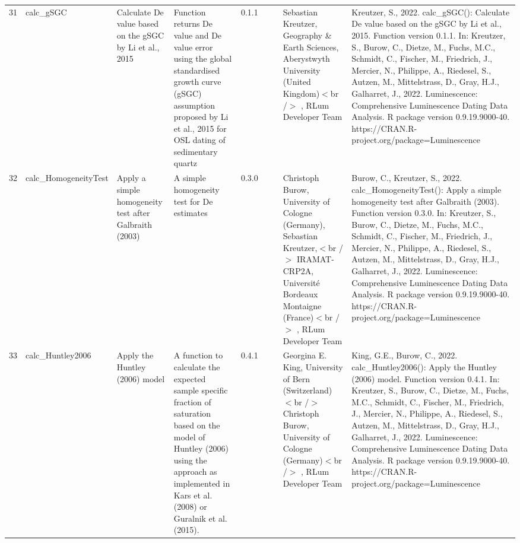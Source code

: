\begin{table}[ht]
\begin{tabular}{rllllllll}
 \\ 
  31 & calc\_gSGC & Calculate De value based on the gSGC by Li et al., 2015 & Function returns De value and De value error using the global standardised growth curve (gSGC) assumption proposed by Li et al., 2015 for OSL dating of sedimentary quartz & 0.1.1
 &  &  & Sebastian Kreutzer, Geography \& Earth Sciences, Aberystwyth University (United Kingdom)$<$br /$>$ , RLum Developer Team & Kreutzer, S., 2022. calc\_gSGC(): Calculate De value based on the gSGC by Li et al., 2015. Function version 0.1.1. In: Kreutzer, S., Burow, C., Dietze, M., Fuchs, M.C., Schmidt, C., Fischer, M., Friedrich, J., Mercier, N., Philippe, A., Riedesel, S., Autzen, M., Mittelstrass, D., Gray, H.J., Galharret, J., 2022. Luminescence: Comprehensive Luminescence Dating Data Analysis. R package version 0.9.19.9000-40. https://CRAN.R-project.org/package=Luminescence
 \\ 
  32 & calc\_HomogeneityTest & Apply a simple homogeneity test after Galbraith (2003) & A simple homogeneity test for De estimates & 0.3.0
 &  &  & Christoph Burow, University of Cologne (Germany), Sebastian Kreutzer,$<$br /$>$ IRAMAT-CRP2A, Université Bordeaux Montaigne (France)$<$br /$>$ , RLum Developer Team & Burow, C., Kreutzer, S., 2022. calc\_HomogeneityTest(): Apply a simple homogeneity test after Galbraith (2003). Function version 0.3.0. In: Kreutzer, S., Burow, C., Dietze, M., Fuchs, M.C., Schmidt, C., Fischer, M., Friedrich, J., Mercier, N., Philippe, A., Riedesel, S., Autzen, M., Mittelstrass, D., Gray, H.J., Galharret, J., 2022. Luminescence: Comprehensive Luminescence Dating Data Analysis. R package version 0.9.19.9000-40. https://CRAN.R-project.org/package=Luminescence
 \\ 
  33 & calc\_Huntley2006 & Apply the Huntley (2006) model & A function to calculate the expected sample specific fraction of saturation based on the model of Huntley (2006) using the approach as implemented in Kars et al. (2008) or Guralnik et al. (2015). & 0.4.1
 &  &  & Georgina E. King, University of Bern (Switzerland)  $<$br /$>$ Christoph Burow, University of Cologne (Germany)$<$br /$>$ , RLum Developer Team & King, G.E., Burow, C., 2022. calc\_Huntley2006(): Apply the Huntley (2006) model. Function version 0.4.1. In: Kreutzer, S., Burow, C., Dietze, M., Fuchs, M.C., Schmidt, C., Fischer, M., Friedrich, J., Mercier, N., Philippe, A., Riedesel, S., Autzen, M., Mittelstrass, D., Gray, H.J., Galharret, J., 2022. Luminescence: Comprehensive Luminescence Dating Data Analysis. R package version 0.9.19.9000-40. https://CRAN.R-project.org/package=Luminescence

\end{tabular}
\end{table}
